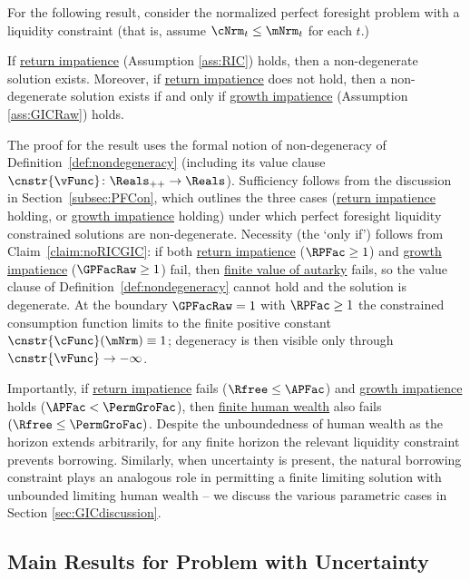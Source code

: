 \documentclass[\econtexRoot/BufferStockTheory]{subfiles}
\begin{document}
For the following result, consider the normalized perfect foresight problem with a liquidity constraint (that is, assume $\cNrm_{t}\leq \mNrm_{t}$ for each $t$.)

\begin{proposition}\label{prop:PFCExist}
 If \hyperlink{RIC}{return impatience} (Assumption \ref{ass:RIC}) holds, then a non-degenerate solution exists. Moreover, if \hyperlink{RIC}{return impatience} does not hold, then a non-degenerate solution exists if and only if \hyperlink{GICRaw}{growth impatience} (Assumption \ref{ass:GICRaw}) holds. 
\end{proposition}

The proof for the result uses the formal notion of non-degeneracy of Definition~\ref{def:nondegeneracy} (including its value clause $\cnstr{\vFunc}\colon\Reals_{++}\to\Reals$). Sufficiency follows from the discussion in Section~\ref{subsec:PFCon}, which outlines the three cases (\hyperlink{RIC}{return impatience} holding, or \hyperlink{GICRaw}{growth impatience} holding) under which perfect foresight liquidity constrained solutions are non-degenerate. Necessity (the `only if') follows from Claim~\ref{claim:noRICGIC}: if both \hyperlink{RIC}{return impatience} ($\RPFac \geq 1$) and \hyperlink{GICRaw}{growth impatience} ($\GPFacRaw \geq 1$) fail, then \hyperlink{FVAC}{finite value of autarky} fails, so the value clause of Definition~\ref{def:nondegeneracy} cannot hold and the solution is degenerate. At the boundary $\GPFacRaw = 1$ with $\RPFac \geq 1$ the constrained consumption function limits to the finite positive constant $\cnstr{\cFunc}(\mNrm)\equiv 1$; degeneracy is then visible only through $\cnstr{\vFunc}\to-\infty$.

Importantly, if \hyperlink{RIC}{return impatience} fails ($\Rfree\leq \APFac$) and \hyperlink{GICRaw}{growth impatience} holds ($\APFac<\PermGroFac$), then \hyperlink{FHWC}{finite human wealth} also fails $(\Rfree \leq \PermGroFac)$.
Despite the unboundedness of human wealth as the horizon extends arbitrarily, for any finite horizon the relevant liquidity constraint prevents borrowing.
Similarly, when uncertainty is present, the natural borrowing constraint plays an analogous role in permitting a finite limiting solution with unbounded limiting human wealth -- we discuss the various parametric cases in Section \ref{sec:GICdiscussion}.


\hypertarget{limsolexists}{}
\subsection{Main Results for Problem with Uncertainty}\label{subsec:limSolExists}
\end{document}
